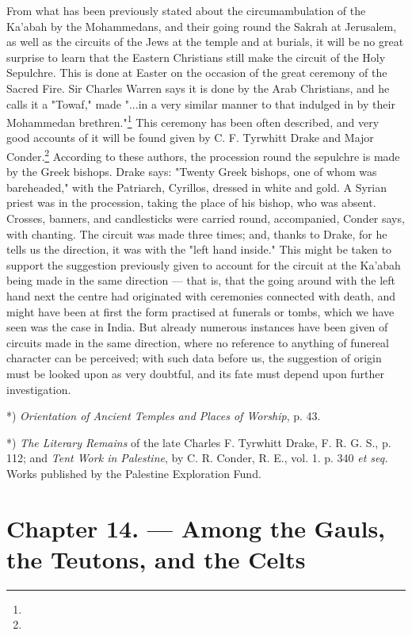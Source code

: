\documentclass[a4paper, 11pt, oneside, polutonikogreek, english]{article}
\begin{document}
From what has been previously stated about the circumambulation of the Ka'abah by the Mohammedans, and their going round the Sakrah at Jerusalem, as well as the circuits of the Jews at the temple and at burials, it will be no great surprise to learn that the Eastern Christians still make the circuit of the Holy Sepulchre. This is done at Easter on the occasion of the great ceremony of the Sacred Fire. Sir Charles Warren says it is done by the Arab Christians, and he calls it a "Towaf," made "...in a very similar manner to that indulged in by their Mohammedan brethren."\footnote{} This ceremony has been often described, and very good accounts of it will be found given by C. F. Tyrwhitt Drake and Major Conder.\footnote{} According to these authors, the procession round the sepulchre is made by the Greek bishops. Drake says: "Twenty Greek bishops, one of whom was bareheaded," with the Patriarch, Cyrillos, dressed in white and gold. A Syrian priest was in the procession, taking the place of his bishop, who was absent. Crosses, banners, and candlesticks were carried round, accompanied, Conder says, with chanting. The circuit was made three times; and, thanks to Drake, for he tells us the direction, it was with the "left hand inside." This might be taken to support the suggestion previously given to account for the circuit at the Ka'abah being made in the same direction --- that is, that the going around with the left hand next the centre had originated with ceremonies connected with death, and might have been at first the form practised at funerals or tombs, which we have seen was the case in India. But already numerous instances have been given of circuits made in the same direction, where no reference to anything of funereal character can be perceived; with such data before us, the suggestion of origin must be looked upon as very doubtful, and its fate must depend upon further investigation.

*) \emph{Orientation of Ancient Temples and Places of Worship}, p. 43.

*) \emph{The Literary Remains} of the late Charles F. Tyrwhitt Drake, F. R. G. S., p. 112; and \emph{Tent Work in Palestine}, by C. R. Conder, R. E., vol. 1. p. 340 \emph{et seq.} Works published by the Palestine Exploration Fund.
\clearpage
\section{Chapter 14. --- Among the Gauls, the Teutons, and the Celts}
\end{document}
